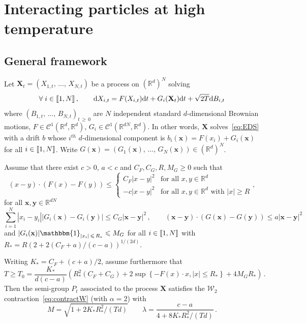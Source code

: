 \documentclass[AHL,Unicode,longabstracts,published]{cedram}
\newcommand{\llbracket}{\mathopen{[\mkern -2.7mu[}}
\newcommand{\rrbracket}{\mathclose{]\mkern -2.7mu]}}
\newcommand{\R}{\mathbb R}
\newcommand{\clC}{\mathcal C}
\newcommand{\clW}{\mathcal W}
\newcommand{\dd}{\mathrm{d}}
\newcommand{\1}{\mathbbm{1}}
\newcommand{\bx}{\mathbf{x}}
\newcommand{\by}{\mathbf{y}}
\newcommand{\bX}{\mathbf{X}}
\let\oldforall\forall
\renewcommand*{\forall}{\mathrel{\oldforall}}
\newcommand{\R}{\mathbb R}
\newcommand{\clW}{\mathcal W}
\begin{document}
\section{Interacting particles at high temperature}\label{sec:particules}

\subsection{General framework} Let $\bX_t = (X_{1,t},\,\dots,\,X_{N,t})$ be a process on $(\R^d)^N$ solving
\[
\forall i\in\llbracket 1,N\rrbracket\,,\qquad \dd X_{i,t} = F(X_{i,t}) \dd t + G_i(\bX_t) \dd t + \sqrt{2T}\dd B_{i,t}
\]
where $(B_{1,t},\,\dots,\,B_{N,t})_{t\,\geqslant\,0}$ are $N$ independent standard $d$-dimensional Brownian motions, $F\in\clC^1(\R^d,\R^d)$, $G_i\in \clC^1(\R^{dN},\R^{d})$. In other words, $\bX$ solves~\eqref{eq:EDS} with a drift $b$ whose $i^{th}$ $d$-dimensional component is $b_i(\bx)= F(x_i)+G_i(\bx)$ for all $i\in\llbracket 1,N\rrbracket$. Write $G(\bx)=(G_1(\bx),\,\dots,\,G_N(\bx))\in (\R^d)^{N}$.

\begin{theo}\label{thm:particules}
Assume that there exist $c>0$, $a<c$ and $C_F,C_G,R,M_G\geqslant 0$ such that
\begin{equation}\label{eq:F}
(x-y)\cdot (F(x)-F(y)) \leqslant \left\{
\begin{array}{ll}
C_F|x-y|^2 & \text{for all } x,y\in\R^d\\
-c|x-y|^2 & \text{for all } x,y\in\R^d \text{ with } |x|\geqslant R
\end{array}\right.,
\end{equation}
 for all $\bx,\by\in \R^{dN}$
\begin{equation}\label{eq:revision}
\sum_{i=1}^N |x_i-y_i||G_i(\bx) - G_i(\by)| \leqslant C_G |\bx-\by|^2 \,,\qquad (\bx-\by)\cdot (G(\bx)-G(\by)) \leqslant a|\bx-\by|^2
\end{equation}
and $|G_i(\bx)|\1_{|x_i|\,\leqslant\,R_*}\leqslant M_G$ for all $i\in\llbracket 1,N\rrbracket$ with $R_* = R\left( 2+2(C_F+a)/(c-a)\right)^{1/(2d)}$.

Writing $K_* = C_F+(c+a)/2$, assume furthermore that
\[
T \geqslant T_0 = \frac{K_*}{d(c-a)} \left( R_*^2\left(C_F+C_G\right) + 2 \sup\left\{-F(x)\cdot x, |x|\leqslant R_*\right\} +4 M_GR_* \right) \,.
\]
Then the semi-group $P_t$ associated to the process $\bX$ satisfies the $\clW_2$ contraction~\eqref{eq:contractW} (with $\alpha=2$) with
\[
M= \sqrt{1+2K_* R_*^2/(Td)}\qquad \lambda = \frac{c-a}{4+8K_* R_*^2/(Td)}\,.
\]
\end{theo}
\end{document}
